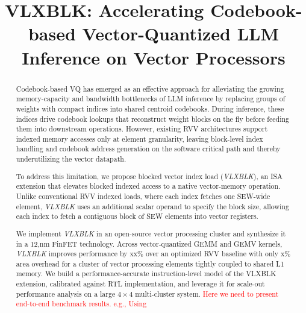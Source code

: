 \documentclass[conference]{IEEEtran}
\begin{document}
\title{VLXBLK: Accelerating Codebook-based Vector-Quantized LLM Inference on Vector Processors \\


}


\maketitle

\begin{abstract}
Codebook-based \gls{VQ} has emerged as an effective approach for alleviating the growing memory-capacity and bandwidth bottlenecks of \gls{LLM} inference by replacing groups of weights with compact indices into shared centroid codebooks. During inference, these indices drive codebook lookups that reconstruct weight blocks on the fly before feeding them into downstream operations. However, existing \gls{RVV} architectures support indexed memory accesses only at element granularity, leaving block-level index handling and codebook address generation on the software critical path and thereby underutilizing the vector datapath.

To address this limitation, we propose blocked vector index load (\emph{VLXBLK}), an ISA extension that elevates blocked indexed access to a native vector-memory operation. Unlike conventional RVV indexed loads, where each index fetches one SEW-wide element, \emph{VLXBLK} uses an additional scalar operand to specify the block size, allowing each index to fetch a contiguous block of SEW elements into vector registers.

We implement \emph{VLXBLK} in an open-source vector processing cluster and synthesize it in a 12,nm FinFET technology. Across vector-quantized GEMM and GEMV kernels, \emph{VLXBLK} improves performance by xx\% over an optimized RVV baseline with only x\% area overhead for a cluster of vector processing elements tightly coupled to shared L1 memory. We build a performance-accurate instruction-level model of the VLXBLK extension, calibrated against RTL implementation, and leverage it for scale-out performance analysis on a large $4\times4$ multi-cluster system.
\textcolor{red}{Here we need to present end-to-end benchmark results. e.g., Using }


\end{abstract}
\end{document}
